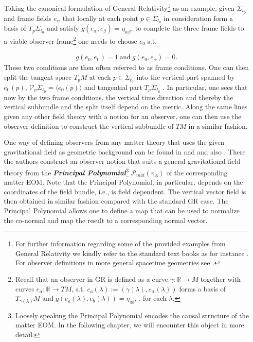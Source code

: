 \documentclass[a4paper,12pt, DIV=14, BCOR=5mm, twoside, headsepline, numbers=noenddot]{scrbook}
\begin{document}
Taking the canonical formulation of General Relativity\footnote{For further information regarding some of the provided examples from General Relativity we kindly refer to the standard text books as for instance \cite{Misner1973}. For observer definitions in more general spacetime geometries see \cite{2011PhRvD..83d4047R}.} as an example, given $\Sigma_{t_0}$ and frame fields $e_{\alpha}$ that locally at each point $p \in \Sigma_{t_0}$ in consideration form a basis of $T_p\Sigma_{t_0}$ and satisfy $g(e_{\alpha},e_{\beta}) = \eta_{\alpha \beta}$, to complete the three frame fields to a viable observer frame\footnote{Recall that an observer in GR is defined as a curve $\gamma : \mathbb{R} \rightarrow M$ together with curves $e_{\alpha} : \mathbb{R} \rightarrow TM$, s.t. $ e_a(\lambda) :=(\dot{\gamma}(\lambda),e_{\alpha}(\lambda))$ forms a basis of $T_{\gamma(\lambda)}M$ and $g(e_a(\lambda),e_b(\lambda)) = \eta_{ab}$, , for each $\lambda$.} one needs to choose $e_0$ s.t. 

\begin{align}
    g(e_0,e_0) = 1 \ \text{and} \ g(e_0,e_{\alpha}) = 0.
\end{align}
These two conditions are then often referred to as frame conditions. One can then split the tangent space $T_pM$ at each $p \in \Sigma_{t_0}$ into the vertical part spanned by $e_0(p)$,  $\mathcal{V}_p\Sigma_{t_0} = \langle  e_0(p) \rangle$ and tangential part $T_p\Sigma_{t_0}$ . In particular, one sees that now by the two frame conditions, the vertical time direction and thereby the vertical subbundle and the split itself depend on the metric. Along the same lines given any other field theory with a notion for an observer, one can then use the observer definition to construct the vertical subbundle of $TM$ in a similar fashion. 

One way of defining observers from any matter theory that uses the given gravitational field as geometric background can be found in \cite{2018PhRvD..97h4036D} and \cite{2011PhRvD..83d4047R} and also \cite{Rivera}. There the authors construct an observer notion that suits a general gravitational field theory from the \textbf{\textit{Principal Polynomial}}\footnote{Loosely speaking the Principal Polynomial encodes the causal structure of the matter EOM. In the following chapter, we will encounter this object in more detail.} $\mathcal{P}_{mat}(v_A)$ of the corresponding matter EOM. Note that the Principal Polynomial, in particular, depends on the coordinates of the field bundle, i.e., is field dependent. The vertical vector field is then obtained in similar fashion compared with the standard GR case. The Principal Polynomial allows one to define a map that can be used to normalize the co-normal and map the result to a corresponding normal vector.
\end{document}
